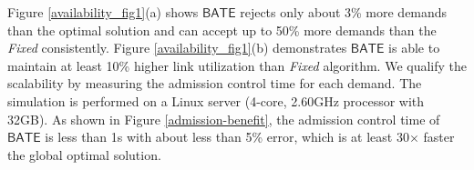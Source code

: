 \documentclass[sigconf]{acmart}
\begin{document}
%



Figure \ref{availability_fig1}(a)  shows $\mathsf{BATE}$  rejects only about 3\% more demands than the optimal solution and can accept up to 50\% more demands than the \textit{Fixed} consistently.
Figure \ref{availability_fig1}(b) demonstrates  $\mathsf{BATE}$ is able to maintain at least 10\% higher link utilization than \textit{Fixed} algorithm.
We qualify the scalability by measuring the admission control time for each demand.
The simulation is performed on a Linux server (4-core, 2.60GHz processor with 32GB).
As shown in Figure \ref{admission-benefit}, the admission control time of $\mathsf{BATE}$ is less than 1s with about less than 5\% error, which is at least 30$\times$ faster the global optimal solution.
\end{document}
